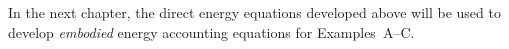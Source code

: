 In the next chapter, the direct energy equations developed above will be used to 
develop \emph{embodied} energy accounting equations for Examples~A--C. %












%
%




